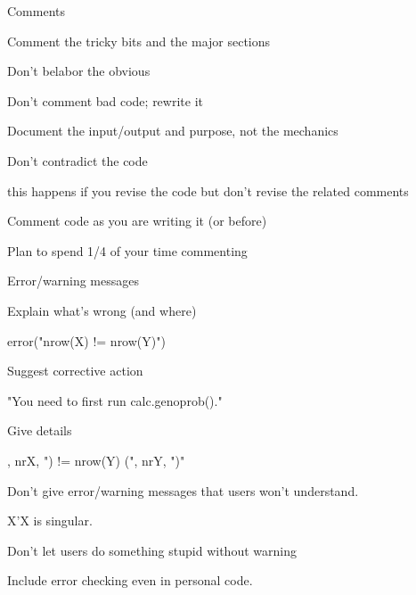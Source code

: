 \documentclass[12pt,t]{beamer}
\begin{document}
\begin{frame}{Comments}

\bbi
\item Comment the tricky bits and the major sections
\item Don't belabor the obvious
\item Don't comment bad code; rewrite it
\item Document the input/output and purpose, not the mechanics
\item Don't contradict the code
  \bi
  \item this happens if you revise the code but don't revise the
    related comments
  \ei
\item Comment code as you are writing it (or before)
\item Plan to spend 1/4 of your time commenting
\ei


\end{frame}




\begin{frame}{Error/warning messages}

\vspace{6pt}

{\small
\bi
\item Explain what's wrong (and where)
  \bi
  \item {\ttsm error("nrow(X) != nrow(Y)")}
  \ei

\item Suggest corrective action
  \bi
  \item {\ttsm "You need to first run calc.genoprob()."}
  \ei

\item Give details
  \bi
  \item {, nrX, {\hilit ") != nrow(Y) ("}, nrY, {\hilit ")"}}
  \ei


\item Don't give error/warning messages that users won't understand.
  \bi
  \item {\ttsm X'X is singular.}
  \ei

\item Don't let users do something stupid without warning

\item Include error checking even in personal code.
\ei
}

\end{frame}
\end{document}
